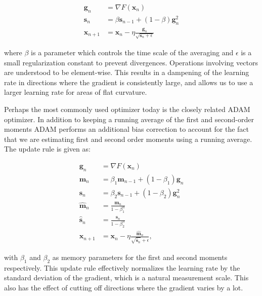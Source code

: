 \begin{equation}
    \begin{split}
        \bm{g}_n &= \nabla F(\bm{x}_n) \\
        \bm{s}_n &= \beta \bm{s}_{n-1} + (1 - \beta)\bm{g}_{n}^2 \\
        \bm{x}_{n+1} &= \bm{x}_n - \eta \frac{\bm{g}_n}
        {\sqrt{\bm{s}_n + \epsilon}}
    \end{split}
\end{equation}

where $\beta$ is a parameter which controls the time scale
of the averaging and $\epsilon$ is a small regularization constant
to prevent divergences. Operations involving vectors are understood
to be element-wise. This results in a dampening of the learning rate
in directions where the gradient is consistently large,
and allows us to use a larger learning rate for areas
of flat curvature.
\par
Perhaps the most commonly used optimizer today is the closely
related ADAM optimizer. In addition to keeping a running average
of the first and second-order moments ADAM performs
an additional bias correction to account for the 
fact that we are estimating first and second order moments
using a running average. The update rule is given as:

\begin{equation}
    \begin{split}
        \bm{g}_n &= \nabla F(\bm{x}_n) \\
        \bm{m}_n &= \beta_1 \bm{m}_{n-1} + (1 - \beta_1)\bm{g}_n \\
        \bm{s}_n &= \beta_2 \bm{s}_{n-1} + (1 - \beta_2)\bm{g}_n^2 \\
        \hat{\bm{m}}_n &= \frac{\bm{m}_n}{1 - \beta_1^n} \\
        \hat{\bm{s}}_n &= \frac{\bm{s}_n}{1 - \beta_2^n} \\
        \bm{x}_{n+1} &= \bm{x}_n - \eta \frac{\hat{\bm{m}}_n}
        {\sqrt{\hat{\bm{s}}_n} + \epsilon} ,
    \end{split}
\end{equation}

with $\beta_1$ and $\beta_2$ as memory parameters for the first and
second moments respectively. This update rule
effectively normalizes the learning rate by the
standard deviation of the gradient, which is a natural
measurement scale. This also has the effect
of cutting off directions where the gradient varies
by a lot.
